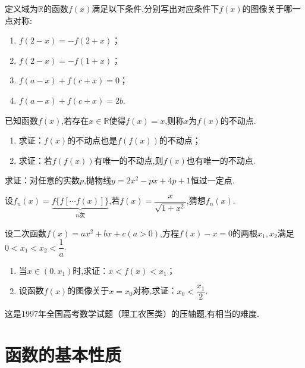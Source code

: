 \documentclass[lang=cn,math=cm,chinesefont=nofont,11pt,scheme=chinese,twocol]{elegantbook}
\begin{document}
\begin{exercise}
  定义域为$\mathbb{R}$的函数$f(x)$满足以下条件,分别写出对应条件下$f(x)$的图像关于哪一点对称:
\end{exercise}

\begin{enumerate}
  \item $f(2-x)=-f(2+x)$；
  \item $f(2-x)=-f(1+x)$；
  \item $f(a-x)+f(c+x)=0$；
  \item $f(a-x)+f(c+x)=2b$.
\end{enumerate}

\begin{exercise}
  已知函数$f(x)$,若存在$x\in\mathbb{R}$使得$f(x)=x$,则称$x$为$f(x)$的不动点.
\end{exercise}

\begin{enumerate}
  \item 求证：$f(x)$的不动点也是$f(f(x))$的不动点；
  \item 求证：若$f(f(x))$有唯一的不动点,则$f(x)$也有唯一的不动点.
\end{enumerate}

\begin{exercise}\label{ASJC_G1_P22.5}
  求证：对任意的实数$p$,抛物线$y=2x^2-px+4p+1$恒过一定点.
\end{exercise}

\begin{exercise}
  设$f_n(x)=\underbrace{f\{f[\cdots f(x)]\}}_{n\text{次}}$,若$f(x)=\dfrac{x}{\sqrt{1+x^2}}$,猜想$f_n(x)$.
\end{exercise}

\begin{exercise}
  设二次函数$f(x)=ax^{2}+bx+c(a>0)$,方程$f(x)-x=0$的两根$x_1,x_2$满足$0<x_1<x_2<\dfrac1a$.
\end{exercise}

\begin{enumerate}
  \item 当$x\in(0,x_1)$时,求证：$x<f(x)<x_1$；
  \item 设函数$f(x)$的图像关于$x=x_0$对称,求证：$x_0<\dfrac{x_1}{2}$.
\end{enumerate}

\begin{remark}
  这是1997年全国高考数学试题（理工农医类）的压轴题,有相当的难度.
\end{remark}

\section{函数的基本性质}
\end{document}
